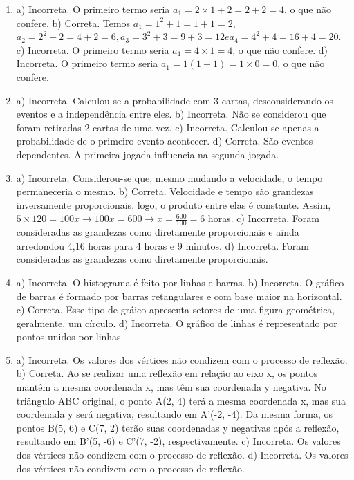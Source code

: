 \begin{enumerate}
\item a) Incorreta. O primeiro termo seria
$a_{1} = 2 \times 1 + 2 = 2 + 2 = 4$, o que não confere.
b) Correta. Temos $a_{1} = 1^{2} + 1 = 1 + 1 = 2$,
$a_{2} = 2^{2} + 2 = 4 + 2 = 6, a_{3} = 3^{2} + 3 = 9 + 3 = 12 e a_{4} = 4^2 + 4 = 16 + 4 = 20$.
c) Incorreta. O primeiro termo seria $a_{1} = 4 \times 1 = 4$, o que não confere.
d) Incorreta. O primeiro termo seria
$a_{1} = 1\left( 1 - 1 \right) = 1 \times 0 = 0$, o que não confere.


\item a) Incorreta. Calculou-se a probabilidade com 3 cartas, desconsiderando os eventos e a independência entre eles.
b) Incorreta. Não se considerou que foram retiradas 2 cartas de uma vez.
c) Incorreta. Calculou-se apenas a probabilidade de o primeiro evento acontecer.
d) Correta. São eventos dependentes. A primeira jogada influencia na segunda jogada.


\item a) Incorreta. Considerou-se que, mesmo mudando a velocidade, o tempo permaneceria o mesmo.
b) Correta. Velocidade e tempo são grandezas inversamente proporcionais, logo, o produto entre elas é constante. Assim,
$5 \times 120 = 100x \rightarrow 100x = 600 \rightarrow x = \frac{600}{100} = 6$ horas.
c) Incorreta. Foram consideradas as grandezas como diretamente proporcionais e ainda arredondou 4,16 horas para 4 horas e 9 minutos.
d) Incorreta. Foram consideradas as grandezas como diretamente proporcionais.


\item a) Incorreta. O histograma é feito por linhas e barras.
b) Incorreta. O gráfico de barras é formado por barras
retangulares e com base maior na horizontal.
c) Correta. Esse tipo de gráico apresenta setores de uma figura geométrica, geralmente, um círculo.
d) Incorreta. O gráfico de linhas é representado por pontos unidos por linhas.


\item a) Incorreta. Os valores dos vértices não condizem com o processo de reflexão.
b) Correta. Ao se realizar uma reflexão em relação ao eixo x, os pontos mantêm a mesma coordenada x, mas têm sua coordenada y negativa.
No triângulo ABC original, o ponto A(2, 4) terá a mesma coordenada x, mas sua coordenada y será negativa, resultando em A'(-2, -4). Da mesma
forma, os pontos B(5, 6) e C(7, 2) terão suas coordenadas y negativas
após a reflexão, resultando em B'(5, -6) e C'(7, -2), respectivamente.
c) Incorreta. Os valores dos vértices não condizem com o processo de reflexão.
d) Incorreta. Os valores dos vértices não condizem com o processo de reflexão.


\end{enumerate}
